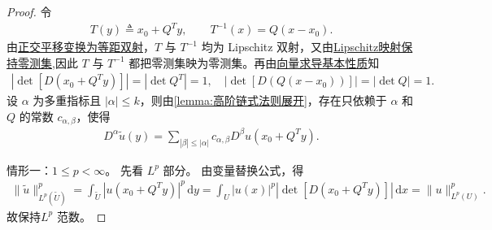\documentclass[../../main.tex]{subfiles}%
\begin{document}
\begin{proof}

令
\begin{align*}
T(y)\triangleq x_0+Q^T y,\qquad T^{-1}(x)=Q(x-x_0).
\end{align*}
由\hyperref[lemma:正交平移变换为等距双射]{正交平移变换为等距双射}，$T$ 与 $T^{-1}$ 均为 Lipschitz 双射，又由\hyperref[Real Analysis-lemma:Lipschitz映射保持零测集]{Lipschitz映射保持零测集},因此 $T$ 与 $T^{-1}$ 都把零测集映为零测集。再由\hyperref[theorem:向量求导基本性质]{向量求导基本性质}知
\begin{align*}
\left| \det \left[ D\left( x_0+Q^Ty \right) \right] \right|=\left| \det Q^T \right|=1,\quad \left| \det \left[ D\left( Q\left( x-x_0 \right) \right) \right] \right|=\left| \det Q \right|=1.
\end{align*}
设 $\alpha$ 为多重指标且 $|\alpha|\leqslant k$，则由\cref{lemma:高阶链式法则展开}，存在只依赖于 $\alpha$ 和 $Q$ 的常数 $c_{\alpha,\beta}$，使得
\begin{align}\label{eqw::JIOjfiojwiojeiowjj23248}
D^\alpha\tilde u(y)=\sum\limits_{|\beta|\leqslant|\alpha|}c_{\alpha,\beta}D^\beta u(x_0+Q^T y).
\end{align}

{\heiti 情形一：$1\leqslant p<\infty$。}
先看 $L^p$ 部分。
由变量替换公式，得
\begin{align*}
\|\tilde u\|_{L^p(\widetilde U)}^p
=\int_{\widetilde U}|u(x_0+Q^T y)|^p\,\mathrm dy
=\int_U|u(x)|^p\left| \det \left[ D\left( x_0+Q^Ty \right) \right] \right|\,\mathrm dx
=\|u\|_{L^p(U)}^p.
\end{align*}
故保持$L^p$ 范数。


\end{proof}
\end{document}
